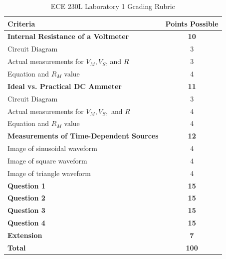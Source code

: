 \documentclass[12pt]{../manual}
\begin{document}
%
\newpage
{}
{}
\hspace{0pt}
\vfill
\begin{table}[ht!]
\caption{ECE 230L Laboratory 1 Grading Rubric}
\centering
\begin{tabular}{l|c} \hline
Criteria & Points Possible \\ \hline \hline
\textbf{Internal Resistance of a Voltmeter}			& \textbf{10} \\
Circuit Diagram												& 3 \\
Actual measurements for $V_M, V_S$, and $R$			& 3 \\
Equation and $R_M$ value									& 4 \\ \hline
\textbf{Ideal vs. Practical DC Ammeter}				& \textbf{11} \\
Circuit Diagram												& 3 \\
Actual measurements for $V_M, V_S,$ and $R$			& 4 \\
Equation and $R_M$ value									& 4 \\ \hline
\textbf{Measurements of Time-Dependent Sources}		& \textbf{12} \\
Image of sinusoidal waveform								& 4 \\
Image of square waveform									& 4 \\
Image of triangle waveform 								& 4 \\ \hline
\textbf{Question 1}											& \textbf{15} \\ \hline
\textbf{Question 2}											& \textbf{15} \\ \hline
\textbf{Question 3}											& \textbf{15} \\ \hline
\textbf{Question 4}											& \textbf{15} \\ \hline
\textbf{Extension}											& \textbf{7} \\ \hline
\textbf{Total}												& \textbf{100} \\ \hline
\end{tabular}
\end{table}
\vfill
\hspace{0pt}
%
\end{document}
